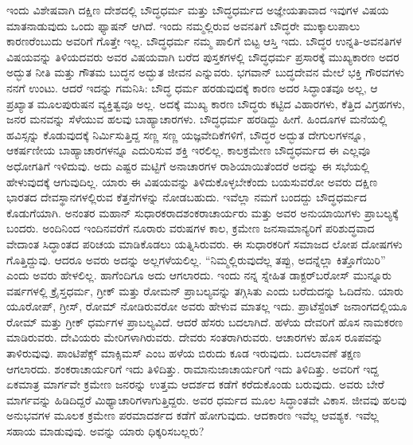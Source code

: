 ಇಂದು ವಿಶೇಷವಾಗಿ ದಕ್ಷಿಣ ದೇಶದಲ್ಲಿ ಬೌದ್ಧಧರ್ಮ ಮತ್ತು ಬೌದ್ಧಧರ್ಮದ ಅಜ್ಞೇಯತಾವಾದ ಇವುಗಳ ವಿಷಯ ಮಾತನಾಡುವುದು ಒಂದು ಫ್ಯಾಷನ್​ ಆಗಿದೆ. ಇಂದು ನಮ್ಮಲ್ಲಿರುವ ಅವನತಿಗೆ ಬೌದ್ಧರೇ ಮುಕ್ಕಾಲುಪಾಲು ಕಾರಣರೆಂಬುದು ಅವರಿಗೆ ಗೊತ್ತೇ ಇಲ್ಲ. ಬೌದ್ಧಧರ್ಮ ನಮ್ಮ ಪಾಲಿಗೆ ಬಿಟ್ಟ ಆಸ್ತಿ ಇದು. ಬೌದ್ಧರ ಉನ್ನತಿ-ಅವನತಿಗಳ ವಿಷಯವನ್ನು ತಿಳಿಯದವರು ಅವರ ವಿಷಯವಾಗಿ ಬರೆದ ಪುಸ್ತಕಗಳಲ್ಲಿ ಬೌದ್ಧಧರ್ಮ ಪ್ರಸಾರಕ್ಕೆ ಮುಖ್ಯಕಾರಣ ಅದರ ಅದ್ಭುತ ನೀತಿ ಮತ್ತು ಗೌತಮ ಬುದ್ಧನ ಅದ್ಭುತ ಜೀವನ ಎನ್ನುವರು. ಭಗವಾನ್​ ಬುದ್ಧದೇವನ ಮೇಲೆ ಭಕ್ತಿ ಗೌರವಗಳು ನನಗೆ ಉಂಟು. ಆದರೆ ಇದನ್ನು ಗಮನಿಸಿ: ಬೌದ್ಧ ಧರ್ಮ ಹರಡುವುದಕ್ಕೆ ಕಾರಣ ಅದರ ಸಿದ್ಧಾಂತವೂ ಅಲ್ಲ, ಆ ಪ್ರಖ್ಯಾತ ಮೂಲಪುರುಷನ ವ್ಯಕ್ತಿತ್ವವೂ ಅಲ್ಲ. ಅದಕ್ಕೆ ಮುಖ್ಯ ಕಾರಣ ಬೌದ್ಧರು ಕಟ್ಟಿದ ವಿಹಾರಗಳು, ಕೆತ್ತಿದ ವಿಗ್ರಹಗಳು, ಜನರ ಮನವನ್ನು ಸೆಳೆಯುವ ಹಲವು ಬಾಹ್ಯಾಚಾರಗಳು. ಬೌದ್ಧಧರ್ಮ ಹರಡಿದ್ದು ಹೀಗೆ. ಹಿಂದೂಗಳ ಮನೆಯಲ್ಲಿ ಹವಿಸ್ಸನ್ನು ಕೊಡುವುದಕ್ಕೆ ನಿರ್ಮಿಸುತ್ತಿದ್ದ ಸಣ್ಣ ಸಣ್ಣ ಯಜ್ಞವೇದಿಕೆಗಳಿಗೆ, ಬೌದ್ಧರ ಅದ್ಭುತ ದೇಗುಲಗಳನ್ನೂ, ಆಕರ್ಷಣೀಯ ಬಾಹ್ಯಾಚಾರಗಳನ್ನೂ ಎದುರಿಸುವ ಶಕ್ತಿ ಇರಲಿಲ್ಲ. ಕಾಲಕ್ರಮೇಣ ಬೌದ್ಧಧರ್ಮದ ಈ ಎಲ್ಲವೂ ಅಧೋಗತಿಗೆ ಇಳಿದುವು. ಅದು ಎಷ್ಟರ ಮಟ್ಟಿಗೆ ಅನಾಚಾರಗಳ ರಾಶಿಯಾಯಿತೆಂದರೆ ಅದನ್ನು ಈ ಸಭೆಯಲ್ಲಿ ಹೇಳುವುದಕ್ಕೆ ಆಗುವುದಿಲ್ಲ. ಯಾರು ಈ ವಿಷಯವನ್ನು ತಿಳಿದುಕೊಳ್ಳಬೇಕೆಂದು ಬಯಸುವರೋ ಅವರು ದಕ್ಷಿಣ ಭಾರತದ ದೇವಸ್ಥಾನಗಳಲ್ಲಿರುವ ಕೆತ್ತನೆಗಳನ್ನು ನೋಡಬಹುದು. ಇವೆಲ್ಲಾ ನಮಗೆ ಬಂದದ್ದು ಬೌದ್ಧಧರ್ಮದ ಕೊಡುಗೆಯಾಗಿ. ಅನಂತರ ಮಹಾನ್​ ಸುಧಾರಕರಾದ\break ಶಂಕರಾಚಾರ್ಯರು ಮತ್ತು ಅವರ ಅನುಯಾಯಿಗಳು ಪ್ರಾಬಲ್ಯಕ್ಕೆ ಬಂದರು. ಅಂದಿನಿಂದ ಇಂದಿನವರೆಗೆ ನೂರಾರು ವರುಷಗಳ ಕಾಲ, ಕ್ರಮೇಣ ಜನಸಾಮಾನ್ಯರಿಗೆ ಪರಿಶುದ್ಧವಾದ ವೇದಾಂತ ಸಿದ್ಧಾಂತದ ಪರಿಚಯ ಮಾಡಿಕೊಡಲು ಯತ್ನಿಸಿರುವರು. ಈ ಸುಧಾರಕರಿಗೆ ಸಮಾಜದ ಲೋಪ ದೋಷಗಳು ಗೊತ್ತಿದ್ದುವು. ಆದರೂ ಅವರು ಅದನ್ನು ಅಲ್ಲಗಳೆಯಲಿಲ್ಲ. “ನಿಮ್ಮಲ್ಲಿರುವುದೆಲ್ಲ ತಪ್ಪು, ಅದನ್ನೆಲ್ಲಾ ಕಿತ್ತೊಗೆಯಿರಿ” ಎಂದು ಅವರು ಹೇಳಲಿಲ್ಲ. ಹಾಗೆಂದಿಗೂ ಅದು ಆಗಲಾರದು. ಇಂದು ನನ್ನ ಸ್ನೇಹಿತ ಡಾಕ್ಟರ್​ ಬರೋಸ್​ ಮುನ್ನೂರು ವರ್ಷಗಳಲ್ಲಿ ಕ್ರೈಸ್ತಧರ್ಮ, ಗ್ರೀಕ್​ ಮತ್ತು ರೋಮನ್​ ಪ್ರಾಬಲ್ಯವನ್ನು ತಗ್ಗಿಸಿತು ಎಂದು ಬರೆದುದನ್ನು ಓದಿದೆನು. ಯಾರು ಯೂರೋಪ್​, ಗ್ರೀಸ್​, ರೋಮ್​ ನೋಡಿರುವರೋ ಅವರು ಹೇಳುವ ಮಾತಲ್ಲ ಇದು. ಪ್ರಾಟೆಸ್ಟೆಂಟ್​ ಜನಾಂಗದಲ್ಲಿಯೂ ರೋಮ್​ ಮತ್ತು ಗ್ರೀಕ್​ ಧರ್ಮಗಳ ಪ್ರಾಬಲ್ಯವಿದೆ. ಆದರೆ ಹೆಸರು ಬದಲಾಗಿದೆ. ಹಳೆಯ ದೇವರಿಗೆ ಹೊಸ ನಾಮಕರಣ ಮಾಡಿರುವರು. ದೇವಿಯರು ಮೇರಿಗಳಾಗಿರುವರು. ದೇವರು ಸಂತರಾಗಿರುವರು. ಆಚಾರಗಳು ಹೊಸ ರೂಪವನ್ನು ತಾಳಿರುವುವು. ಪಾಂಟಿಪೆಕ್ಸ್ ಮಾಕ್ಸಿಮಸ್​ ಎಂಬ ಹಳೆಯ ಬಿರುದು ಕೂಡ ಇರುವುದು. ಬದಲಾವಣೆ ತಕ್ಷಣ ಆಗಲಾರದು. ಶಂಕರಾಚಾರ್ಯರಿಗೆ ಇದು ತಿಳಿದಿತ್ತು. ರಾಮಾನುಜಾಚಾರ್ಯರಿಗೆ ಇದು ತಿಳಿದಿತ್ತು. ಅವರಿಗೆ ಇದ್ದ ಏಕಮಾತ್ರ ಮಾರ್ಗವೇ ಕ್ರಮೇಣ ಜನರನ್ನು ಉತ್ತಮ ಆದರ್ಶದ ಕಡೆಗೆ ಕರೆದುಕೊಂಡು ಬರುವುದು. ಅವರು ಬೇರೆ ಮಾರ್ಗವನ್ನು ಹಿಡಿದಿದ್ದರೆ ಮಿಥ್ಯಾಚಾರಿಗಳಾಗುತ್ತಿದ್ದರು. ಅವರ ಧರ್ಮದ ಮೂಲ ಸಿದ್ಧಾಂತವೇ ವಿಕಾಸ. ಜೀವವು ಹಲವು ಅನುಭವಗಳ ಮೂಲಕ ಕ್ರಮೇಣ ಪರಮಾದರ್ಶದ ಕಡೆಗೆ ಹೋಗುವುದು. ಆದಕಾರಣ ಇವೆಲ್ಲ ಆವಶ್ಯಕ. ಇವೆಲ್ಲ ಸಹಾಯ ಮಾಡುವುವು. ಅವನ್ನು ಯಾರು ಧಿಕ್ಕರಿಸಬಲ್ಲರು?

